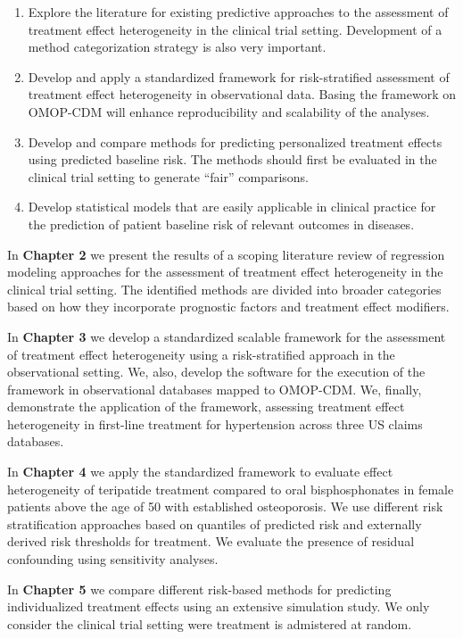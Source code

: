 \documentclass[
]{book}
\providecommand{\tightlist}{%
  \setlength{\itemsep}{0pt}\setlength{\parskip}{0pt}}
\begin{document}
\begin{enumerate}
\def\labelenumi{\arabic{enumi}.}
\tightlist
\item
  Explore the literature for existing predictive approaches to the assessment
  of treatment effect heterogeneity in the clinical trial setting. Development
  of a method categorization strategy is also very important.
\item
  Develop and apply a standardized framework for risk-stratified assessment of
  treatment effect heterogeneity in observational data. Basing the framework on
  OMOP-CDM will enhance reproducibility and scalability of the analyses.
\item
  Develop and compare methods for predicting personalized treatment effects
  using predicted baseline risk. The methods should first be evaluated in the
  clinical trial setting to generate ``fair'' comparisons.
\item
  Develop statistical models that are easily applicable in clinical practice
  for the prediction of patient baseline risk of relevant outcomes in diseases.
\end{enumerate}

In \textbf{Chapter 2} we present the results of a scoping literature review of
regression modeling approaches for the assessment of treatment effect
heterogeneity in the clinical trial setting. The identified methods are divided
into broader categories based on how they incorporate prognostic factors and
treatment effect modifiers.

In \textbf{Chapter 3} we develop a standardized scalable framework for the assessment
of treatment effect heterogeneity using a risk-stratified approach in the
observational setting. We, also, develop the software for the execution of the
framework in observational databases mapped to OMOP-CDM. We, finally,
demonstrate the application of the framework, assessing treatment effect
heterogeneity in first-line treatment for hypertension across three US claims
databases.

In \textbf{Chapter 4} we apply the standardized framework to evaluate effect
heterogeneity of teripatide treatment compared to oral bisphosphonates in female
patients above the age of 50 with established osteoporosis. We use different
risk stratification approaches based on quantiles of predicted risk and
externally derived risk thresholds for treatment. We evaluate the presence of
residual confounding using sensitivity analyses.

In \textbf{Chapter 5} we compare different risk-based methods for predicting
individualized treatment effects using an extensive simulation study. We only
consider the clinical trial setting were treatment is admistered at random.
\end{document}
